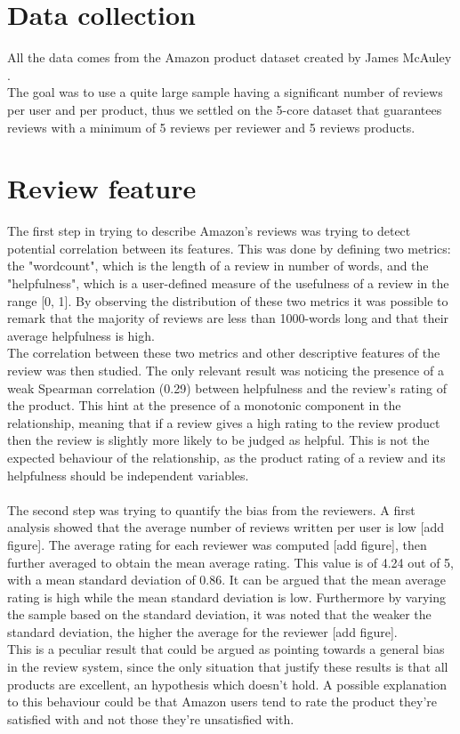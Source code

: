 \documentclass[11pt]{article}
\begin{document}
\section{Data collection}
All the data comes from the Amazon product dataset created by James McAuley \cite{mcauley2015image}.\\
 The goal was to use a quite large sample having a significant number of reviews per user and per product, thus we settled on the 5-core dataset that guarantees reviews with a minimum of 5 reviews per reviewer and 5 reviews products.
\section{Review feature}
    The first step in trying to describe Amazon's reviews was trying to detect potential correlation between its features. This was done by defining two metrics: the "wordcount", which is 
  the length of a review in number of words, and the "helpfulness", which is a user-defined measure of the usefulness of a review in the range [0, 1]. By observing the distribution of these two metrics it was possible to remark that the majority of reviews are less than 1000-words long and that their average helpfulness is high.\\ The correlation between these two metrics and  other descriptive features of the review was then studied. The only relevant result was noticing the presence of a weak Spearman correlation (0.29) between helpfulness and the review's rating of the product. This hint at the presence of a monotonic component in the relationship, meaning that if a review gives a high rating to the review product then the review is slightly more likely to be judged as helpful. This is not the expected behaviour of the relationship, as the product rating of a review and its helpfulness should be independent variables.\\\\
The second step was trying to quantify the bias from the reviewers. A first analysis showed that the average number of reviews written per user is low [add figure]. The average rating for each reviewer was computed [add figure], then further averaged to obtain the mean average rating. This value is of 4.24 out of 5, with a mean standard deviation of 0.86. It can be argued that the mean average rating is high while the mean standard deviation is low. Furthermore by varying the sample based on the standard deviation, it was noted that the weaker the standard deviation, the higher the average for the reviewer [add figure].\\ This is a peculiar result that could be argued as pointing towards a general bias in the review system, since the only situation that justify these results is that all products are excellent, an hypothesis which doesn't hold. A possible explanation to this behaviour could be that Amazon users  tend to rate the product they're satisfied with and not those they're unsatisfied with.\\\\
\end{document}
